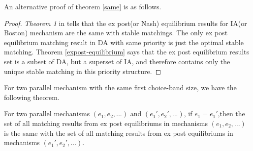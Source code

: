 An alternative proof of theorem \ref{same} is as follows.
\begin{proof}
  \emph{Theorem 1} in  \parencite{Ergin2006} tells that the ex post(or Nash) equilibrium results for IA(or Boston) mechanism are the same with stable matchings. The only ex post equilibrium matching result  in DA with same priority is just the optimal stable matching. Theorem \ref{expost-equilibrium} says that the ex post equilibrium results set is a subset of DA, but a superset of IA, and therefore contains only the unique stable matching in this priority structure.
\end{proof}  




For two parallel mechanism with the same first choice-band size, we have the following theorem.

\begin{thm}
  \label{first-equal}  
 For two parallel mechanisms $(e_1,e_2,...)$ and $(e_1',e_2',...)$, if $e_1 = e_1'$,then the set of all matching results from  ex post equilibriums  in mechanisms $(e_1,e_2,...)$ is the same with the set of all matching results from  ex post equilibriums in mechanisms $(e_1',e_2',...)$.
\end{thm}

